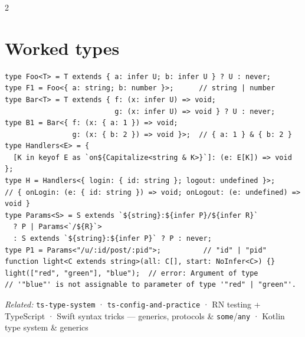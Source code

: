\documentclass[8pt]{extarticle}
\begin{document}
\begin{multicols}{2}
\section{Worked types}
\begin{lstlisting}[style=ts]
type Foo<T> = T extends { a: infer U; b: infer U } ? U : never;
type F1 = Foo<{ a: string; b: number }>;      // string | number
type Bar<T> = T extends { f: (x: infer U) => void;
                          g: (x: infer U) => void } ? U : never;
type B1 = Bar<{ f: (x: { a: 1 }) => void;
                g: (x: { b: 2 }) => void }>;  // { a: 1 } & { b: 2 }
type Handlers<E> = {
  [K in keyof E as `on${Capitalize<string & K>}`]: (e: E[K]) => void };
type H = Handlers<{ login: { id: string }; logout: undefined }>;
// { onLogin: (e: { id: string }) => void; onLogout: (e: undefined) => void }
type Params<S> = S extends `${string}:${infer P}/${infer R}`
  ? P | Params<`/${R}`>
  : S extends `${string}:${infer P}` ? P : never;
type P1 = Params<"/u/:id/post/:pid">;          // "id" | "pid"
function light<C extends string>(all: C[], start: NoInfer<C>) {}
light(["red", "green"], "blue");  // error: Argument of type
// '"blue"' is not assignable to parameter of type '"red" | "green"'.
\end{lstlisting}

\end{multicols}

{\raggedright\noindent\footnotesize\color{sheetGrey}\textit{Related:} \texttt{ts-type-system} ·
\texttt{ts-config-and-practice} · RN testing + TypeScript · Swift syntax tricks — generics,
protocols \& \texttt{some}/\texttt{any} · Kotlin type system \& generics\par}
\end{document}
